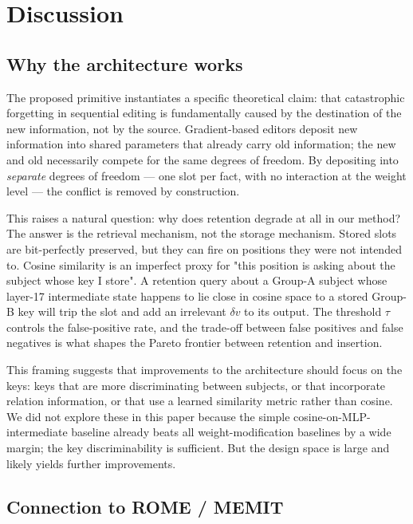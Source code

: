 \documentclass[11pt,a4paper]{article}
\begin{document}
\section{Discussion}

\subsection{Why the architecture works}

The proposed primitive instantiates a specific theoretical claim: that
catastrophic forgetting in sequential editing is fundamentally caused by
the destination of the new information, not by the source.
Gradient-based editors deposit new information into shared parameters
that already carry old information; the new and old necessarily
compete for the same degrees of freedom. By depositing into
\emph{separate} degrees of freedom --- one slot per fact, with no
interaction at the weight level --- the conflict is removed by
construction.

This raises a natural question: why does retention degrade at all in
our method? The answer is the retrieval mechanism, not the storage
mechanism. Stored slots are bit-perfectly preserved, but they can fire
on positions they were not intended to. Cosine similarity is an
imperfect proxy for "this position is asking about the subject whose
key I store". A retention query about a Group-A subject whose layer-17
intermediate state happens to lie close in cosine space to a stored
Group-B key will trip the slot and add an irrelevant $\delta v$ to its
output. The threshold $\tau$ controls the false-positive rate, and the
trade-off between false positives and false negatives is what shapes
the Pareto frontier between retention and insertion.

This framing suggests that improvements to the architecture should
focus on the keys: keys that are more discriminating between subjects,
or that incorporate relation information, or that use a learned
similarity metric rather than cosine. We did not explore these in this
paper because the simple cosine-on-MLP-intermediate baseline already
beats all weight-modification baselines by a wide margin; the key
discriminability is sufficient. But the design space is large and
likely yields further improvements.

\subsection{Connection to ROME / MEMIT}
\end{document}

